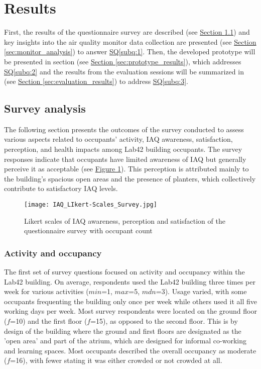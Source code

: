 \section{Results}
\label{sec:results}

First, the results of the questionnaire survey are described (see \hyperref[sec:survey_analysis]{Section \ref*{sec:survey_analysis}}) and key insights into the air quality monitor data collection are presented (see \hyperref[sec:monitor_analysis] {Section \ref*{sec:monitor_analysis}}) to answer \hyperref[subq:1]{SQ\ref*{subq:1}}. Then, the developed prototype will be presented in section (see \hyperref[sec:prototype_results]{Section \ref*{sec:prototype_results}}), which addresses \hyperref[subq:2]{SQ\ref*{subq:2}} and the results from the evaluation sessions will be summarized in (see \hyperref[sec:evaluation_results]{Section \ref*{sec:evaluation_results}}) to address \hyperref[subq:3]{SQ\ref*{subq:3}}.

\subsection{Survey analysis}
\label{sec:survey_analysis}

The following section presents the outcomes of the survey conducted to assess various aspects related to occupants' activity, IAQ awareness, satisfaction, perception, and health impacts among Lab42 building occupants. The survey responses indicate that occupants have limited awareness of IAQ but generally perceive it as acceptable (see \hyperref[fig:likert-scales-survey]{Figure \ref*{fig:likert-scales-survey}}). This perception is attributed mainly to the building's spacious open areas and the presence of planters, which collectively contribute to satisfactory IAQ levels.

\begin{figure}[H]
    \centering
    \texttt{[image: IAQ\_LIkert-Scales\_Survey.jpg]}
    \caption{Likert scales of IAQ awareness, perception and satisfaction of the questionnaire survey with occupant count}
    \label{fig:likert-scales-survey}
\end{figure}

\subsubsection{Activity and occupancy}

The first set of survey questions focused on activity and occupancy within the Lab42 building. On average, respondents used the Lab42 building three times per week for various activities ($min$=1, $max$=5, $mdn$=3). Usage varied, with some occupants frequenting the building only once per week while others used it all five working days per week. Most survey respondents were located on the ground floor ($f$=10) and the first floor ($f$=15), as opposed to the second floor. This is by design of the building where the ground and first floors are designated as the 'open area' and part of the atrium, which are designed for informal co-working and learning spaces. Most occupants described the overall occupancy as moderate ($f$=16), with fewer stating it was either crowded or not crowded at all.

